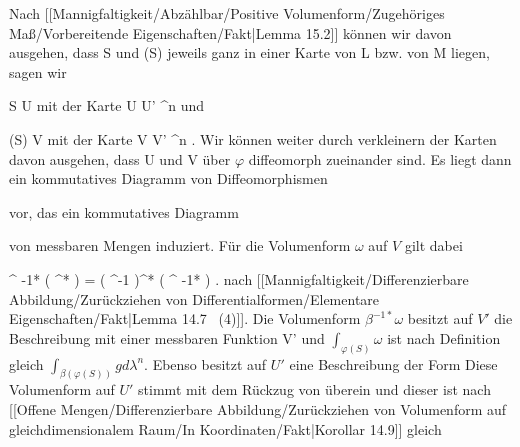 {

Nach
[[Mannigfaltigkeit/Abzählbar/Positive Volumenform/Zugehöriges Maß/Vorbereitende Eigenschaften/Fakt|Lemma 15.2]]
können wir davon ausgehen, dass
\mathkor {} {S} {und} {\varphi(S)} {}
jeweils ganz in einer Karte von
\mathkor {} {L} {bzw. von} {M} {}
liegen, sagen wir

\mavergleichskette
{\vergleichskette
{ S
}
{ \subseteq }{ U
}
{  }{
}
{    }{
}
{   }{
}
}
{}{}{}
mit der Karte
\maabbdisp {\alpha} { U } { U' \subseteq \R^n
} {}
und

\mavergleichskette
{\vergleichskette
{ \varphi(S)
}
{ \subseteq }{ V
}
{  }{
}
{    }{
}
{   }{
}
}
{}{}{}
mit der Karte
\maabbdisp {\beta} { V } { V' \subseteq \R^n
} {.}
Wir können weiter durch verkleinern der Karten davon ausgehen, dass
\mathkor {} {U} {und} {V} {}
über $\varphi$ diffeomorph zueinander sind. Es liegt dann ein kommutatives Diagramm von Diffeomorphismen

 {  }

vor, das ein kommutatives Diagramm

 {  }

von messbaren Mengen induziert. Für die Volumenform $\omega$ auf $V$ gilt dabei

\mavergleichskettedisp
{\vergleichskette
{ \alpha^{ {-1}*} ( \varphi^* \omega)
}
{ =} { \left(  \beta \circ \varphi \circ \alpha^{-1}  \right)^*  ( \beta^{ {-1}*} \omega)
}
{ } {
}
{ } {
}
{ } {
}
}
{}{}{.}
nach
[[Mannigfaltigkeit/Differenzierbare Abbildung/Zurückziehen von Differentialformen/Elementare Eigenschaften/Fakt|Lemma 14.7  (4)]].
Die Volumenform $\beta^{ {-1}*} \omega$ besitzt auf $V'$ die Beschreibung
 mit einer messbaren Funktion
 {V'} {\R
} {}
und $\int_{\varphi(S)} \omega$ ist nach Definition gleich $\int_{\beta( \varphi(S))} g d \lambda^n$. Ebenso besitzt
 auf $U'$ eine Beschreibung der Form
 Diese Volumenform auf $U'$ stimmt mit dem Rückzug von
 überein und dieser ist nach
[[Offene Mengen/Differenzierbare Abbildung/Zurückziehen von Volumenform auf gleichdimensionalem Raum/In Koordinaten/Fakt|Korollar 14.9]]
gleich

}
